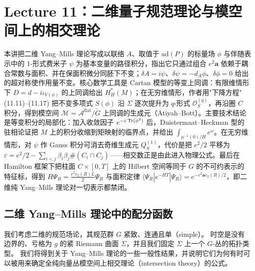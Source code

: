 \section{Lecture 11：二维量子规范理论与模空间上的相交理论}

\begin{keytakeaways}
本讲把二维 Yang–Mills 理论写成以联络 $A$、取值于 $\mathrm{ad}(P)$ 的标量场 $\phi$ 与伴随表示中的 1-形式费米子 $\psi$ 为基本变量的路径积分，指出它只通过组合 $e^2\mathbf{a}$ 依赖于耦合常数与面积、并在保面积微分同胚下不变；$\delta A=i\psi$、$\delta\psi=-d_A\phi$、$\delta\phi=0$ 给出的超对称使作用量不变。核心数学工具是 Cartan 模型的等变上同调：有限维情形下 $D=d-i\iota_{V(\phi)}$ 的上同调给出 $H^*_H(M)$；在无穷维情形，作者用"下降方程"(11.11)–(11.17) 把不变多项式 $S(\phi)$ 沿 $\Sigma$ 逐次提升为 $q$-形式 $\mathcal{O}_S^{(q)}$，再沿圈 $C$ 积分，得到模空间 $\mathcal{M}=\mathcal{A}^{\mathrm{flat}}/\widetilde G$ 上同调的生成元（Atiyah–Bott）。主要技术结论是等变积分的局部化：加入收敛因子 $e^{-\varepsilon\operatorname{Tr}(\phi^2)}$ 后，Duistermaat–Heckman 型的驻相论证把 $M$ 上的积分收缩到矩映射的临界点，并给出 $\int_{\mu^{-1}(0)/H}e^{\omega}$。在无穷维情形，对 $\psi$ 作 Gauss 积分可消去奇维生成元 $Q_S^{(1)}$，代价是把 $e^2/2$ 平移为 $\varepsilon=e^2/2-\sum_{i<j}\beta_i\beta_j\#(C_i\cap C_j)$——相交数正是由此进入物理公式。最后在 Hamilton 框架下把柱面 $C\times[0,T]$ 上的 Hilbert 空间等同于 $G$ 的不可约表示的特征标，得到 $H\Psi_R=\frac{e^2c_2(R)L}{2}\Psi_R$ 与面积定律 $\langle\Psi_R|e^{-HT}|\Psi_R\rangle=e^{-e^2\mathbf{a}c_2(R)/2}$，即二维纯 Yang–Mills 理论对一切表示都禁闭。
\end{keytakeaways}

\subsection{二维 Yang–Mills 理论中的配分函数}

我们考虑二维的规范场论，其规范群 $G$ 紧致、连通且单（simple）。
时空是没有边界的、亏格为 $g$ 的紧 Riemann 曲面 $\Sigma$，并且我们固定 $\Sigma$ 上一个 $G$-丛的拓扑类型。
我们将得到关于 Yang–Mills 理论的一些一般性结果，并说明它们为何有时可以被用来确定全纯向量丛模空间上相交理论（intersection theory）的公式。

